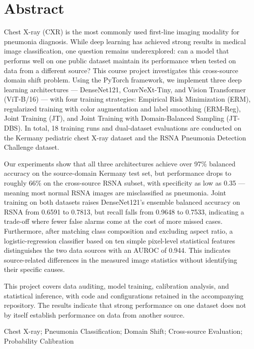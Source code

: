 \documentclass[12pt,a4paper,UTF8,openany]{ctexbook}
\newenvironment{enabstract}{
  \chapter*{\centering\bfseries\zihao{3} Abstract}
  \addcontentsline{toc}{chapter}{Abstract}
  \thispagestyle{plain}
  \setlength{\parindent}{0em}
}{
  \par\vspace{2em}
  \noindent{\bfseries Keywords: }Chest X-ray; Pneumonia Classification; Domain Shift; Cross-source Evaluation; Probability Calibration
}
\begin{document}
\begin{enabstract}

Chest X-ray (CXR) is the most commonly used first-line imaging modality for pneumonia diagnosis. While deep learning has achieved strong results in medical image classification, one question remains underexplored: can a model that performs well on one public dataset maintain its performance when tested on data from a different source? This course project investigates this cross-source domain shift problem. Using the PyTorch framework, we implement three deep learning architectures — DenseNet121, ConvNeXt-Tiny, and Vision Transformer (ViT-B/16) — with four training strategies: Empirical Risk Minimization (ERM), regularized training with color augmentation and label smoothing (ERM-Reg), Joint Training (JT), and Joint Training with Domain-Balanced Sampling (JT-DBS). In total, 18 training runs and dual-dataset evaluations are conducted on the Kermany pediatric chest X-ray dataset and the RSNA Pneumonia Detection Challenge dataset.

Our experiments show that all three architectures achieve over 97\% balanced accuracy on the source-domain Kermany test set, but performance drops to roughly 66\% on the cross-source RSNA subset, with specificity as low as 0.35 — meaning most normal RSNA images are misclassified as pneumonia. Joint training on both datasets raises DenseNet121's ensemble balanced accuracy on RSNA from 0.6591 to 0.7813, but recall falls from 0.9648 to 0.7533, indicating a trade-off where fewer false alarms come at the cost of more missed cases. Furthermore, after matching class composition and excluding aspect ratio, a logistic-regression classifier based on ten simple pixel-level statistical features distinguishes the two data sources with an AUROC of 0.944. This indicates source-related differences in the measured image statistics without identifying their specific causes.

This project covers data auditing, model training, calibration analysis, and statistical inference, with code and configurations retained in the accompanying repository. The results indicate that strong performance on one dataset does not by itself establish performance on data from another source.

\end{enabstract}

\renewcommand{\contentsname}{\centering\heiti\zihao{3} 目\quad 录}
\tableofcontents
\thispagestyle{plain}
\end{document}
